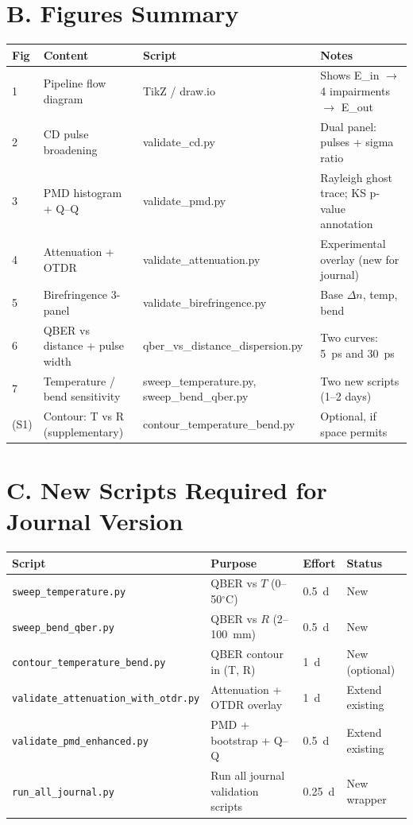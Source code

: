 \documentclass[11pt,a4paper]{article}
\begin{document}
\section{B. Figures Summary}

\begin{longtable}{p{1cm} p{6cm} p{3cm} p{3.5cm}}
  \toprule
  \textbf{Fig} & \textbf{Content} & \textbf{Script} & \textbf{Notes} \\
  \midrule
  \endhead
  1 & Pipeline flow diagram & TikZ / draw.io &
    Shows E\_in $\rightarrow$ 4 impairments $\rightarrow$ E\_out \\
  \hline
  2 & CD pulse broadening & validate\_cd.py &
    Dual panel: pulses + sigma ratio \\
  \hline
  3 & PMD histogram + Q--Q & validate\_pmd.py &
    Rayleigh ghost trace; KS p-value annotation \\
  \hline
  4 & Attenuation + OTDR & validate\_attenuation.py &
    Experimental overlay (new for journal) \\
  \hline
  5 & Birefringence 3-panel & validate\_birefringence.py &
    Base $\Delta n$, temp, bend \\
  \hline
  6 & QBER vs distance + pulse width & qber\_vs\_distance\_dispersion.py &
    Two curves: 5~ps and 30~ps \\
  \hline
  7 & Temperature / bend sensitivity & sweep\_temperature.py,
    sweep\_bend\_qber.py &
    Two new scripts (1--2 days) \\
  \hline
  (S1) & Contour: T vs R (supplementary) & contour\_temperature\_bend.py &
    Optional, if space permits \\
  \bottomrule
\end{longtable}


\section{C. New Scripts Required for Journal Version}

\begin{longtable}{p{4cm} p{4cm} p{3cm} p{3cm}}
  \toprule
  \textbf{Script} & \textbf{Purpose} & \textbf{Effort} & \textbf{Status} \\
  \midrule
  \endhead
  \texttt{sweep\_temperature.py} & QBER vs $T$ (0--50$^\circ$C) & 0.5~d &
    New \\
  \hline
  \texttt{sweep\_bend\_qber.py} & QBER vs $R$ (2--100~mm) & 0.5~d &
    New \\
  \hline
  \texttt{contour\_temperature\_bend.py} & QBER contour in (T, R) & 1~d &
    New (optional) \\
  \hline
  \texttt{validate\_attenuation\_with\_otdr.py} & Attenuation + OTDR overlay
    & 1~d & Extend existing \\
  \hline
  \texttt{validate\_pmd\_enhanced.py} & PMD + bootstrap + Q--Q &
    0.5~d & Extend existing \\
  \hline
  \texttt{run\_all\_journal.py} & Run all journal validation scripts &
    0.25~d & New wrapper \\
  \bottomrule
\end{longtable}
\end{document}
